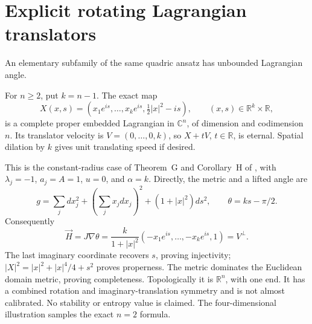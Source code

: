 \chapter{Explicit rotating Lagrangian translators}\label{sec:catalogue-jlt-rotating-translators}
An elementary subfamily of the same quadric ansatz has unbounded Lagrangian angle.
\begin{example}\label{ex:catalogue-jlt-rotating-translators}
For $n\geq2$, put $k=n-1$. The exact map
\[
 X(x,s)=\left(x_1e^{is},\ldots,x_ke^{is},\tfrac12|x|^2-is\right),
 \qquad (x,s)\in\mathbb R^k\times\mathbb R,
\]
is a complete proper embedded Lagrangian in $\mathbb C^n$, of dimension and codimension $n$. Its translator velocity is $V=(0,\ldots,0,k)$, so $X+tV$, $t\in\mathbb R$, is eternal. Spatial dilation by $k$ gives unit translating speed if desired.

This is the constant-radius case of Theorem~G and Corollary~H of \cite{CatJoyceLeeTsui2010}, with $\lambda_j=-1$, $a_j=A=1$, $u=0$, and $\alpha=k$. Directly, the metric and a lifted angle are
\[
 g=\sum_jdx_j^2+\left(\sum_jx_jdx_j\right)^2+(1+|x|^2)ds^2,
 \qquad \theta=ks-\pi/2.
\]
Consequently
\[
 \vec H=J\nabla\theta
 =\frac{k}{1+|x|^2}(-x_1e^{is},\ldots,-x_ke^{is},1)=V^\perp.
\]
The last imaginary coordinate recovers $s$, proving injectivity; $|X|^2=|x|^2+|x|^4/4+s^2$ proves properness. The metric dominates the Euclidean domain metric, proving completeness. Topologically it is $\mathbb R^n$, with one end. It has a combined rotation and imaginary-translation symmetry and is not almost calibrated. No stability or entropy value is claimed. The four-dimensional illustration samples the exact $n=2$ formula.
\end{example}

